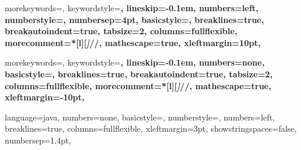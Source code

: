 
\newcommand{\jbasicstyle}{\small\sffamily} %
\newcommand{\textcode}[1]{{#1}}
\newcommand{\jnumberstyle}{\scriptsize}
\newcommand{\Hilight}{\makebox[0pt][l]{\color{gray}\rule[-3pt]{0.80\linewidth}{9pt}}}

{
  morekeywords={},
  keywordstyle=\bfseries,
  lineskip=-0.1em,
  numbers=left, %
  numberstyle=\jnumberstyle,
  numbersep=4pt,
  basicstyle=\jbasicstyle,
  breaklines=true,
  breakautoindent=true,
  tabsize=2,
  columns=fullflexible,
  morecomment=*[l][\textsl]{//},
  mathescape=true,
  xleftmargin=10pt,
}

{
  morekeywords={},
  keywordstyle=\bfseries,
  lineskip=-0.1em,
  numbers=none,
  basicstyle=\jbasicstyle,
  breaklines=true,
  breakautoindent=true,
  tabsize=2,
  columns=fullflexible,
  morecomment=*[l][\textsl]{//},
  mathescape=true,
  xleftmargin=-10pt,
}

{
  language=java,
  numbers=none,                 
  basicstyle=\scriptsize\ttfamily,
  numberstyle=\scriptsize\tiny,
  numbers=left,
  breaklines=true,
  columns=fullflexible,
  xleftmargin=3pt,
  showstringspaces=false,
  numbersep=1.4pt,
}


